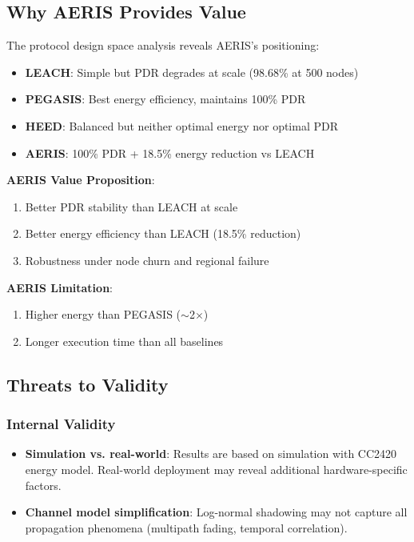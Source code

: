 \subsection{Why AERIS Provides Value}

The protocol design space analysis reveals AERIS's positioning:

\begin{itemize}
    \item \textbf{LEACH}: Simple but PDR degrades at scale (98.68\% at 500 nodes)
    \item \textbf{PEGASIS}: Best energy efficiency, maintains 100\% PDR
    \item \textbf{HEED}: Balanced but neither optimal energy nor optimal PDR
    \item \textbf{AERIS}: 100\% PDR + 18.5\% energy reduction vs LEACH
\end{itemize}

\textbf{AERIS Value Proposition}:
\begin{enumerate}
    \item Better PDR stability than LEACH at scale
    \item Better energy efficiency than LEACH (18.5\% reduction)
    \item Robustness under node churn and regional failure
\end{enumerate}

\textbf{AERIS Limitation}:
\begin{enumerate}
    \item Higher energy than PEGASIS ($\sim$2$\times$)
    \item Longer execution time than all baselines
\end{enumerate}

\subsection{Threats to Validity}

\subsubsection{Internal Validity}

\begin{itemize}
    \item \textbf{Simulation vs. real-world}: Results are based on
    simulation with CC2420 energy model. Real-world deployment may reveal
    additional hardware-specific factors.

    \item \textbf{Channel model simplification}: Log-normal shadowing
    may not capture all propagation phenomena (multipath fading,
    temporal correlation).
\end{itemize}

